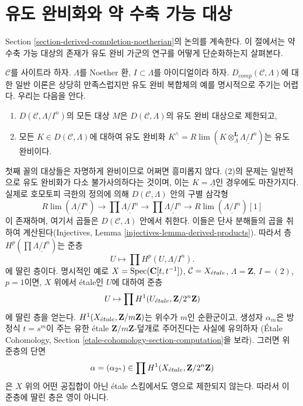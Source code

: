 \section{유도 완비화와 약 수축 가능 대상}
\label{section-derived-completion-proetale}

\noindent
Section \ref{section-derived-completion-noetherian}의 논의를 계속한다.
이 절에서는 약 수축 가능 대상의 존재가 유도 완비 가군의 연구를
어떻게 단순화하는지 살펴본다.

\medskip\noindent
$\mathcal{C}$를 사이트라 하자. $\Lambda$를 Noether 환,
$I \subset \Lambda$를 아이디얼이라 하자.
$D_{comp}(\mathcal{C}, \Lambda)$에 대한 일반 이론은 상당히 만족스럽지만
유도 완비 복합체의 예를 명시적으로 주기는 어렵다. 우리는 다음을 안다.
\begin{enumerate}
\item $D(\mathcal{C}, \Lambda/I^n)$의 모든 대상 $M$은
$D(\mathcal{C}, \Lambda)$의 유도 완비 대상으로 제한되고,
\item 모든 $K \in D(\mathcal{C}, \Lambda)$에 대하여 유도 완비화
$K^\wedge = R\lim (K \otimes_\Lambda^\mathbf{L}
\underline{\Lambda/I^n})$는 유도 완비이다.
\end{enumerate}
첫째 꼴의 대상들은 자명하게 완비이므로 어쩌면 흥미롭지 않다.
(2)의 문제는 일반적으로 유도 완비화가 다소 불가사의하다는 것이며,
이는 $K = \underline{\Lambda}$인 경우에도 마찬가지다.
실제로 호모토피 극한의 정의에 의해 $D(\mathcal{C}, \Lambda)$ 안의
구별 삼각형
$$
R\lim(\underline{\Lambda/I^n}) \to
\prod \underline{\Lambda/I^n} \to
\prod \underline{\Lambda/I^n} \to
R\lim(\underline{\Lambda/I^n})[1]
$$
이 존재하며, 여기서 곱들은 $D(\mathcal{C}, \Lambda)$ 안에서 취한다.
이들은 단사 분해들의 곱을 취하여 계산된다(Injectives, Lemma
\ref{injectives-lemma-derived-products}). 따라서 층
$H^p(\prod \underline{\Lambda/I^n})$는 준층
$$
U \longmapsto \prod H^p(U, \Lambda/I^n).
$$
에 딸린 층이다. 명시적인 예로
$X = \mathop{\mathrm{Spec}}(\mathbf{C}[t, t^{-1}])$, $\mathcal{C} = X_{\acute{e}tale}$,
$\Lambda = \mathbf{Z}$, $I = (2)$, $p = 1$이면, $X$ 위에서 \'etale인
$U$에 대하여 준층
$$
U \mapsto \prod H^1(U_{\acute{e}tale}, \mathbf{Z}/2^n\mathbf{Z})
$$
에 딸린 층을 얻는다. $H^1(X_{\acute{e}tale}, \mathbf{Z}/m\mathbf{Z})$는 위수가
$m$인 순환군이고, 생성자 $\alpha_m$은 방정식 $t = s^m$이 주는 유한
\'etale $\mathbf{Z}/m\mathbf{Z}$-덮개로 주어진다는 사실에 유의하자
(\'Etale Cohomology, Section
\ref{etale-cohomology-section-computation}을 보라). 그러면 위 준층의
단면
$$
\alpha = (\alpha_{2^n}) \in \prod H^1(X_{\acute{e}tale}, \mathbf{Z}/2^n\mathbf{Z})
$$
은 $X$ 위의 어떤 공집합이 아닌 \'etale 스킴에서도 영으로 제한되지
않는다. 따라서 이 준층에 딸린 층은 영이 아니다.

